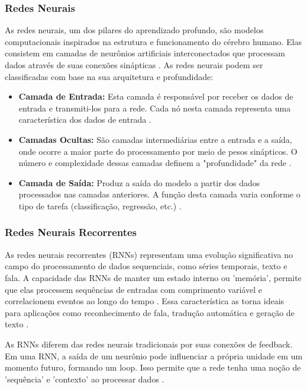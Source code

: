 \documentclass[conference]{IEEEtran}
\begin{document}
\subsubsection{Redes Neurais} As redes neurais, um dos pilares do aprendizado profundo, 
são modelos computacionais inspirados na estrutura e funcionamento do cérebro humano. 
Elas consistem em camadas de neurônios artificiais interconectados que processam dados 
através de suas conexões sinápticas \cite{Haykin2009}. 
As redes neurais podem ser classificadas com base na sua arquitetura e profundidade:

\begin{itemize}
\item {\textbf{Camada de Entrada:}}
Esta camada é responsável por receber os dados de entrada e transmiti-los para a rede. 
Cada nó nesta camada representa uma característica dos dados de entrada \cite{Goodfellow2016}.
\item {\textbf{Camadas Ocultas:}}
São camadas intermediárias entre a entrada e a saída, onde ocorre a maior parte do 
processamento por meio de pesos sinápticos. O número e complexidade dessas camadas 
definem a "profundidade" da rede \cite{Schmidhuber2015}.
\item {\textbf{Camada de Saída:}}
Produz a saída do modelo a partir dos dados processados nas camadas anteriores. 
A função desta camada varia conforme o 
tipo de tarefa (classificação, regressão, etc.) \cite{LeCun2015}.
\end{itemize}

\subsubsection{Redes Neurais Recorrentes} As redes neurais recorrentes (RNNs) representam uma 
evolução significativa no campo do processamento de dados sequenciais, 
como séries temporais, texto e fala. A capacidade das RNNs de manter um 
estado interno ou 'memória', permite que elas processem sequências de entradas 
com comprimento variável e correlacionem eventos ao longo do tempo \cite{Graves2013}. 
Essa característica as torna ideais para aplicações como reconhecimento de fala, 
tradução automática e geração de texto \cite{Sutskever2014}.

As RNNs diferem das redes neurais tradicionais por suas conexões de feedback. 
Em uma RNN, a saída de um neurônio pode influenciar a própria unidade em um momento futuro, formando um loop. 
Isso permite que a rede tenha uma noção de 'sequência' e 
'contexto' ao processar dados \cite{Elman1990}.
\end{document}
